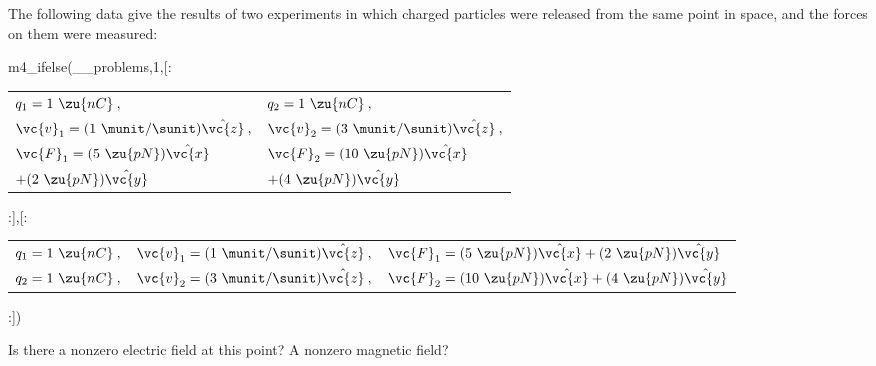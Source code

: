         The following data give the results of two experiments in which charged particles
        were released from the same point in space, and the forces on them were measured:

m4_ifelse(__problems,1,[:
        \begin{tabular}{ll}
                $q_1=1\ \zu{nC}\:,$ 
                     & $q_2=1\ \zu{nC}\:,$   \\
                $\vc{v}_1=(1\ \munit/\sunit)\hat{\vc{z}}\:,$ 
                     & $\vc{v}_2=(3\ \munit/\sunit)\hat{\vc{z}}\:,$ \\
                $\vc{F}_1=(5\ \zu{pN})\hat{\vc{x}}$
                   & $\vc{F}_2=(10\ \zu{pN})\hat{\vc{x}}$\\
                \hfill $+(2\ \zu{pN})\hat{\vc{y}}$
                   & \hfill $+(4\ \zu{pN})\hat{\vc{y}}$ \\
        \end{tabular}
:],[:
        \begin{tabular}{lll}
                $q_1=1\ \zu{nC}\:,$ & $\vc{v}_1=(1\ \munit/\sunit)\hat{\vc{z}}\:,$ & $\vc{F}_1=(5\ \zu{pN})\hat{\vc{x}}+(2\ \zu{pN})\hat{\vc{y}}$\\
                $q_2=1\ \zu{nC}\:,$ & $\vc{v}_2=(3\ \munit/\sunit)\hat{\vc{z}}\:,$ & $\vc{F}_2=(10\ \zu{pN})\hat{\vc{x}}+(4\ \zu{pN})\hat{\vc{y}}$\\
        \end{tabular}
:])


        \noindent Is there a nonzero electric field at this point? A nonzero magnetic field?
